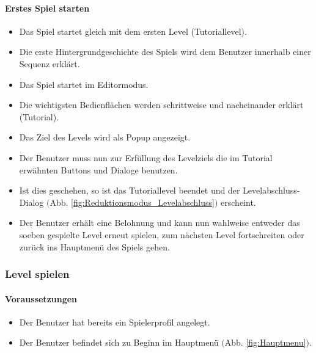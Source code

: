 \paragraph{Erstes Spiel starten}
\begin{itemize}
	\item Das Spiel startet gleich mit dem ersten Level (Tutoriallevel).
	\item Die erste Hintergrundgeschichte des Spiels wird dem Benutzer innerhalb einer Sequenz erklärt.
	\item Das Spiel startet im Editormodus.
	\item Die wichtigsten Bedienflächen werden schrittweise und nacheinander erklärt (Tutorial).
	\item Das Ziel des Levels wird als Popup angezeigt.
	\item Der Benutzer muss nun zur Erfüllung des Levelziels die im Tutorial erwähnten Buttons und Dialoge benutzen.
	\item Ist dies geschehen, so ist das Tutoriallevel beendet und der Levelabschluss-Dialog $($Abb. \ref{fig:Reduktionsmodus_Levelabschluss}$)$ erscheint.
	\item Der Benutzer erhält eine Belohnung und kann nun wahlweise entweder das soeben gespielte Level erneut spielen, zum nächsten Level fortschreiten oder zurück ins Hauptmenü des Spiels gehen.
\end{itemize}

\subsubsection{Level spielen}
\paragraph{Voraussetzungen}
\begin{itemize}
	\item Der Benutzer hat bereits ein Spielerprofil angelegt.
	\item Der Benutzer befindet sich zu Beginn im Hauptmenü $($Abb. \ref{fig:Hauptmenu}$)$.
\end{itemize}
